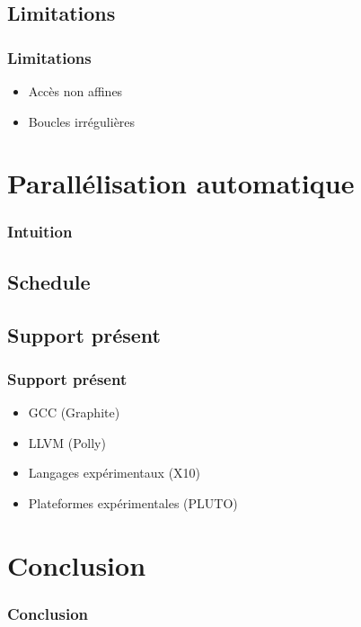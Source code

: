 \documentclass{beamer}
\begin{document}
\subsection{Limitations}
\begin{frame}
\frametitle{Limitations}
\begin{itemize}
\item Accès non affines
\item Boucles irrégulières
\end{itemize}
\end{frame}

\section{Parallélisation automatique}
\begin{frame}
\frametitle{Intuition}

\end{frame}

\subsection{Schedule}

\subsection{Support présent}
\begin{frame}
\frametitle{Support présent}
\begin{itemize}
\item GCC (Graphite)
\item LLVM (Polly)
\item Langages expérimentaux (X10)
\item Plateformes expérimentales (PLUTO)
\end{itemize}
\end{frame}

\section{Conclusion}
\begin{frame}
\frametitle{Conclusion}
\end{frame}
\end{document}
